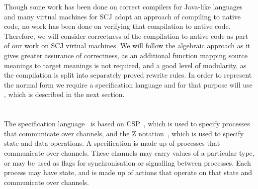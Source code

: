 \documentclass[a4paper,10pt]{report}
\begin{document}
Though some work has been done on correct compilers for Java-like languages and
many virtual machines for SCJ adopt an approach of compiling to native code, no
work has been done on verifying that compilation to native code.  Therefore, we
will consider correctness of the compilation to native code as part of our work
on SCJ virtual machines.  We will follow the algebraic approach as it gives
greater assurance of correctness, as an additional function mapping source
meanings to target meanings is not required, and a good level of modularity, as
the compilation is split into separately proved rewrite rules.  In order to
represent the normal form we require a specification language and for that
purpose will use \Circus{}, which is described in the next section.

\section{\Circus{}}
\label{circus-section}

The \Circus{} specification language~\cite{oliveira2009} is based on
CSP~\cite{roscoe2011}, which is used to specify processes that communicate over
channels, and the Z notation~\cite{woodcock1996}, which is used to specify state
and data operations.  A \Circus{} specification is made up of processes that
communicate over channels.  These channels may carry values of a particular
type, or may be used as flags for synchronisation or signalling between
processes.  Each process may have state, and is made up of actions that operate
on that state and communicate over channels.
\end{document}
